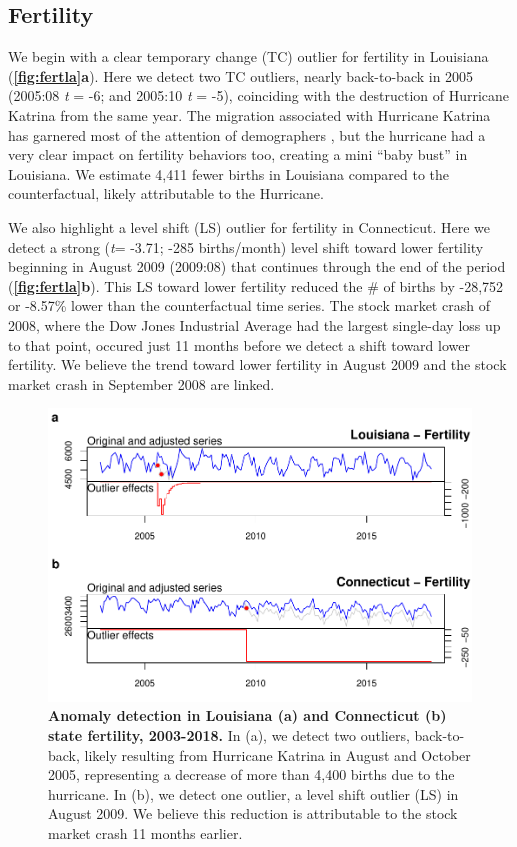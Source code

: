 \documentclass[12pt]{article}
\begin{document}
\hypertarget{fertility}{%
\subsection{Fertility}\label{fertility}}

We begin with a clear temporary change (TC) outlier for fertility in
Louisiana (\textbf{\autoref{fig:fertla}a}). Here we detect two TC
outliers, nearly back-to-back in 2005 (2005:08 \emph{t} = -6; and
2005:10 \emph{t} = -5), coinciding with the destruction of Hurricane
Katrina from the same year. The migration associated with Hurricane
Katrina has garnered most of the attention of demographers
\citep{fussellRecoveryMigrationCity2014, horiDisplacementDynamicsSouthern2009},
but the hurricane had a very clear impact on fertility behaviors too,
creating a mini ``baby bust'' in Louisiana. We estimate 4,411 fewer
births in Louisiana compared to the counterfactual, likely attributable
to the Hurricane.

We also highlight a level shift (LS) outlier for fertility in
Connecticut. Here we detect a strong (\emph{t}= -3.71; -285
births/month) level shift toward lower fertility beginning in August
2009 (2009:08) that continues through the end of the period
(\textbf{\autoref{fig:fertla}b}). This LS toward lower fertility reduced
the \# of births by -28,752 or -8.57\% lower than the counterfactual
time series. The stock market crash of 2008, where the Dow Jones
Industrial Average had the largest single-day loss up to that point,
occured just 11 months before we detect a shift toward lower fertility.
We believe the trend toward lower fertility in August 2009 and the stock
market crash in September 2008 are linked.

\begin{figure}
\centering
\includegraphics{manuscript_files/figure-latex/FertilityAnomalies-1.pdf}
\caption{\textbf{Anomaly detection in Louisiana (a) and Connecticut (b) state fertility, 2003-2018.}
In (a), we detect two outliers, back-to-back, likely resulting from
Hurricane Katrina in August and October 2005, representing a decrease of
more than 4,400 births due to the hurricane. In (b), we detect one
outlier, a level shift outlier (LS) in August 2009. We believe this
reduction is attributable to the stock market crash 11 months earlier.
\label{fig:fertla}}
\end{figure}
\end{document}
